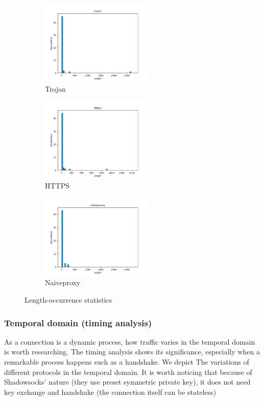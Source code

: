 \documentclass[conference]{IEEEtran}
\begin{document}
\begin{figure}[H]
    \centering
    \begin{subfigure}[b]{0.40\textwidth}
        \includegraphics[width=\textwidth, height=4cm]{pics/occurrence_of_length_trojan.png}
        \caption{Trojan}
    \end{subfigure}
    \hfill
    \begin{subfigure}[b]{0.40\textwidth}
        \includegraphics[width=\textwidth, height=4cm]{pics/occurrence_of_length_https.png}
        \caption{HTTPS}
    \end{subfigure}
    \hfill
    \begin{subfigure}[b]{0.40\textwidth}
        \includegraphics[width=\textwidth, height=4cm]{pics/occurrence_of_length_naiveproxy.png}
        \caption{Naiveproxy}
    \end{subfigure}
    \caption{Length-occurrence statistics}
\end{figure}

\subsubsection{Temporal domain (timing analysis)}
As a connection is a dynamic process, how traffic varies in the temporal domain is worth researching. The timing analysis shows its significance, especially when a remarkable process happens such as a handshake. 
We depict The variations of different protocols in the temporal domain. It is worth noticing that because of Shadowsocks' nature (they use preset symmetric private key), it does not need key exchange and handshake (the connection itself can be stateless)
\end{document}
